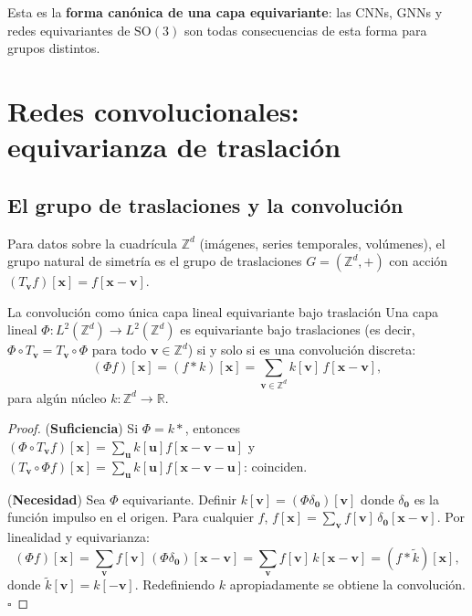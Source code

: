 Esta es la \textbf{forma canónica de una capa equivariante}: las CNNs, GNNs y
redes equivariantes de $\mathrm{SO}(3)$ son todas consecuencias de esta forma
para grupos distintos.

\section{Redes convolucionales: equivarianza de traslación}
\label{sec:cnn}

\subsection{El grupo de traslaciones y la convolución}
\label{subsec:translacion}

Para datos sobre la cuadrícula $\mathbb{Z}^d$ (imágenes, series temporales,
volúmenes), el grupo natural de simetría es el grupo de traslaciones
$G = (\mathbb{Z}^d, +)$ con acción $(T_{\bm{v}}f)[\bm{x}] = f[\bm{x}-\bm{v}]$.

\begin{teorema}{La convolución como única capa lineal equivariante bajo traslación}
\label{thm:conv_equivar}
Una capa lineal $\Phi: L^2(\mathbb{Z}^d) \to L^2(\mathbb{Z}^d)$ es equivariante
bajo traslaciones (es decir, $\Phi \circ T_{\bm{v}} = T_{\bm{v}} \circ \Phi$
para todo $\bm{v} \in \mathbb{Z}^d$) si y solo si es una convolución discreta:
\[
  (\Phi f)[\bm{x}] = (f * k)[\bm{x}] = \sum_{\bm{v} \in \mathbb{Z}^d}
  k[\bm{v}]\,f[\bm{x}-\bm{v}],
\]
para algún núcleo $k: \mathbb{Z}^d \to \mathbb{R}$.
\end{teorema}

\begin{proof}
(\textbf{Suficiencia}) Si $\Phi = k*$, entonces
$(\Phi \circ T_{\bm{v}}f)[\bm{x}] = \sum_{\bm{u}} k[\bm{u}] f[\bm{x}-\bm{v}-\bm{u}]$
y $(T_{\bm{v}} \circ \Phi f)[\bm{x}] = \sum_{\bm{u}} k[\bm{u}] f[\bm{x}-\bm{v}-\bm{u}]$:
coinciden.

(\textbf{Necesidad}) Sea $\Phi$ equivariante. Definir $k[\bm{v}] = (\Phi\delta_{\bm{0}})[\bm{v}]$
donde $\delta_{\bm{0}}$ es la función impulso en el origen. Para cualquier $f$,
$f[\bm{x}] = \sum_{\bm{v}} f[\bm{v}]\,\delta_{\bm{0}}[\bm{x}-\bm{v}]$.
Por linealidad y equivarianza:
\[
  (\Phi f)[\bm{x}]
  = \sum_{\bm{v}} f[\bm{v}]\,(\Phi\delta_{\bm{0}})[\bm{x}-\bm{v}]
  = \sum_{\bm{v}} f[\bm{v}]\,k[\bm{x}-\bm{v}]
  = (f*\tilde{k})[\bm{x}],
\]
donde $\tilde{k}[\bm{v}] = k[-\bm{v}]$. Redefiniendo $k$ apropiadamente se
obtiene la convolución. $\square$
\end{proof}

